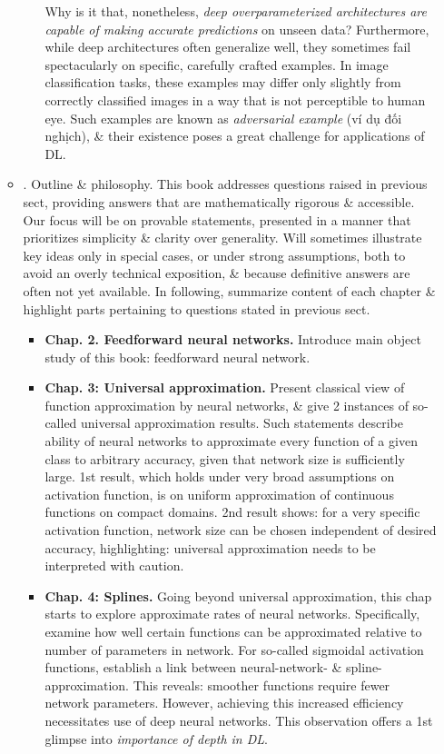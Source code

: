 \documentclass{article}
\begin{document}
\begin{itemize}
\begin{itemize}
\begin{itemize}
			Why is it that, nonetheless, {\it deep overparameterized architectures are capable of making accurate predictions} on unseen data? Furthermore, while deep architectures often generalize well, they sometimes fail spectacularly on specific, carefully crafted examples. In image classification tasks, these examples may differ only slightly from correctly classified images in a way that is not perceptible to human eye. Such examples are known as {\it adversarial example} (ví dụ đối nghịch), \& their existence poses a great challenge for applications of DL.
		\end{itemize}
		\item {. Outline \& philosophy.} This book addresses questions raised in previous sect, providing answers that are mathematically rigorous \& accessible. Our focus will be on provable statements, presented in a manner that prioritizes simplicity \& clarity over generality. Will sometimes illustrate key ideas only in special cases, or under strong assumptions, both to avoid an overly technical exposition, \& because definitive answers are often not yet available. In following, summarize content of each chapter \& highlight parts pertaining to questions stated in previous sect.
		\begin{itemize}
			\item {\bf Chap. 2. Feedforward neural networks.} Introduce main object study of this book: feedforward neural network.
			\item {\bf Chap. 3: Universal approximation.} Present classical view of function approximation by neural networks, \& give 2 instances of so-called universal approximation results. Such statements describe ability of neural networks to approximate every function of a given class to arbitrary accuracy, given that network size is sufficiently large. 1st result, which holds under very broad assumptions on activation function, is on uniform approximation of continuous functions on compact domains. 2nd result shows: for a very specific activation function, network size can be chosen independent of desired accuracy, highlighting: universal approximation needs to be interpreted with caution.
			\item {\bf Chap. 4: Splines.} Going beyond universal approximation, this chap starts to explore approximate rates of neural networks. Specifically, examine how well certain functions can be approximated relative to number of parameters in network. For so-called sigmoidal activation functions, establish a link between neural-network- \& spline-approximation. This reveals: smoother functions require fewer network parameters. However, achieving this increased efficiency necessitates use of deep neural networks. This observation offers a 1st glimpse into {\it importance of depth in DL}.

\end{itemize}
\end{itemize}
\end{itemize}
\end{document}
